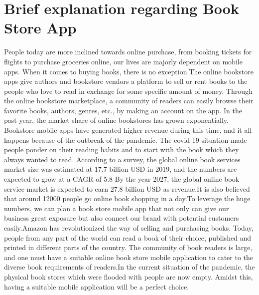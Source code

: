 \chapter{Brief explanation regarding Book Store App}\label{code}
\begin{normalsize}
People today are more inclined towards online purchase, from booking tickets for flights to purchase groceries online, our lives are majorly dependent on mobile apps. When it comes to buying books, there is no exception.The online bookstore apps give authors and bookstore vendors a platform to sell or rent books to the people who love to read in exchange for some specific amount of money. Through the online bookstore marketplace, a community of readers can easily browse their favorite books, authors, genres, etc., by making an account on the app.
In the past year, the market share of online bookstores has grown exponentially. Bookstore mobile apps have generated higher revenue during this time, and it all happens because of the outbreak of the pandemic. The covid-19 situation made people ponder on their reading habits and to start with the book which they always wanted to read.
According to a survey, the global online book services market size was estimated at 17.7 billion USD in 2019, and the numbers are expected to grow at a CAGR of 5.8%
By the year 2027, the global online book service market is expected to earn 27.8 billion USD as revenue.It is also believed that around 12000 people go online book shopping in a day.To leverage the huge numbers, we can plan a book store mobile app that not only can give our business great exposure but also connect our brand with potential customers easily.Amazon has revolutionized the way of selling and purchasing books. Today, people from any part of the world can read a book of their choice, published and printed in different parts of the country. The community of book readers is large, and one must have a suitable online book store mobile application to cater to the diverse book requirements of readers.In the current situation of the pandemic, the physical book stores which were flooded with people are now empty. Amidst this, having a suitable mobile application will be a perfect choice.

\\[1cm]
\end{normalsize}